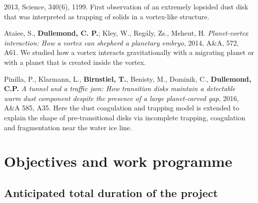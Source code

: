 \documentclass[10pt,fleqn,twoside]{article}
\newcommand{\missing}[1]{\textcolor{red}{\textbf{XXX #1 XXX}}}
\begin{document}
\begin{literature}
  2013, Science, 340(6), 1199. First observation of an extremely
  lopsided dust disk that was interpreted as trapping of solids in a
  vortex-like structure.
\item Ataiee, S., \textbf{Dullemond, C. P.}; Kley, W., Regály, Zs.,
  Meheut, H. \textit{Planet-vortex interaction: How a vortex can
  shepherd a planetary embryo}, 2014, A\&A, 572, A61. We studied how a
  vortex interacts gravitationally with a migrating planet or with a
  planet that is created inside the vortex.
\item Pinilla, P., Klarmann, L., \textbf{Birnstiel, T.}, Benisty, M.,
  Dominik, C., \textbf{Dullemond, C.P.} {\em A tunnel and a traffic
  jam: How transition disks maintain a detectable warm dust component
  despite the presence of a large planet-carved gap}, 2016, A\&A 585,
  A35. Here the dust coagulation and trapping model is extended to
  explain the shape of pre-transitional disks via incomplete trapping,
  coagulation and fragmentation near the water ice line.
\end{literature}

% 
% 
% 
% 
% 
% 
% 
% 

\section{Objectives and work programme}


\subsection{Anticipated total duration of the project}
\end{document}
